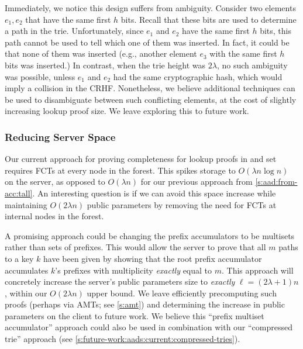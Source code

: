 Immediately, we notice this design suffers from ambiguity.
Consider two elements $e_1,e_2$ that have the same first $h$ bits.
Recall that these bits are used to determine a path in the trie.
Unfortunately, since $e_1$ and $e_2$ have the same first $h$ bits, this path cannot be used to tell which one of them was inserted.
In fact, it could be that none of them was inserted (e.g., another element $e_3$ with the same first $h$ bits was inserted.)
In contrast, when the trie height was $2\lambda$, no such ambiguity was possible, unless $e_1$ and $e_2$ had the same cryptographic hash, which would imply a collision in the CRHF.
Nonetheless, we believe additional techniques can be used to disambiguate between such conflicting elements, at the cost of slightly increasing lookup proof size.
We leave exploring this to future work.

\subsubsection{Reducing Server Space}
\label{s:future-work:aads:current:multiset-prefix-acc}
Our current approach for proving completeness for lookup proofs in \biaadset and \rsaaadset set requires FCTs at every node in the forest.
This spikes storage to $O(\lambda n \log{n})$ on the server, as opposed to $O(\lambda n)$ for our previous approach from \cref{s:aad:from-acc:tall}.
An interesting question is if we can avoid this space increase while maintaining $O(2\lambda n)$ public parameters by removing the need for FCTs at internal nodes in the forest.

A promising approach could be changing the prefix accumulators to be multisets rather than sets of prefixes.
This would allow the server to prove that all $m$ paths to a key $k$ have been given by showing that the root prefix accumulator accumulates $k$'s prefixes with multiplicity \textit{exactly} equal to $m$.
This approach will concretely increase the server's public parameters size to \textit{exactly} $\ell = (2\lambda+1){n}$, within our $O(2\lambda n)$ upper bound.
We leave efficiently precomputing such proofs (perhaps via AMTs; see \cref{s:amt}) and determining the increase in public parameters on the client to future work.
We believe this ``prefix multiset accumulator'' approach could also be used in combination with our ``compressed trie'' approach (see \cref{s:future-work:aads:current:compressed-tries}).

